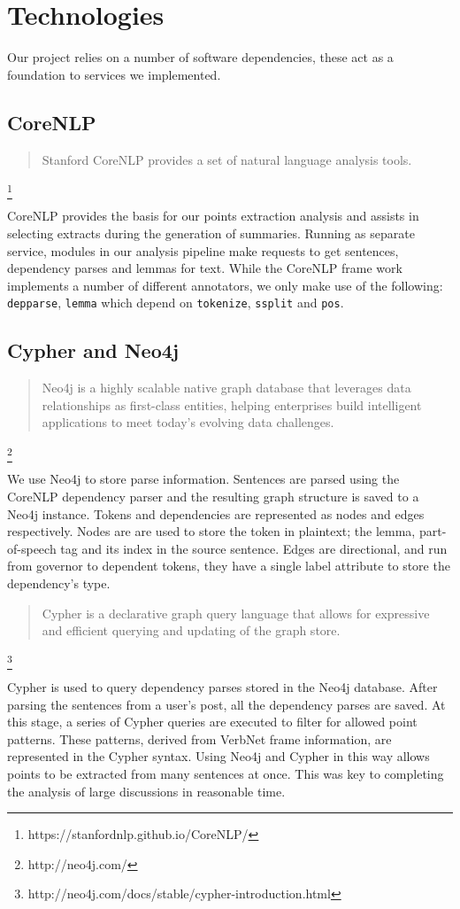 \chapter{Technologies\label{chap:technologies}}
  Our project relies on a number of software dependencies, these act as a foundation to services we implemented.

  \tocless\section{CoreNLP}
    \blockquote{Stanford CoreNLP provides a set of natural language analysis tools.}\footnote{https://stanfordnlp.github.io/CoreNLP/}

    CoreNLP provides the basis for our points extraction analysis and assists in selecting extracts during the generation of summaries. Running as separate service, modules in our analysis pipeline make requests to get sentences, dependency parses and lemmas for text. While the CoreNLP frame work implements a number of different annotators, we only make use of the following: \texttt{depparse}, \texttt{lemma} which depend on \texttt{tokenize}, \texttt{ssplit} and \texttt{pos}.

  \tocless\section{Cypher and Neo4j}
    \blockquote{Neo4j is a highly scalable native graph database that leverages data relationships as first-class entities, helping enterprises build intelligent applications to meet today's evolving data challenges.}\footnote{http://neo4j.com/}

    We use Neo4j to store parse information. Sentences are parsed using the CoreNLP dependency parser and the resulting graph structure is saved to a Neo4j instance. Tokens and dependencies are represented as nodes and edges respectively. Nodes are are used to store the token in plaintext; the lemma, part-of-speech tag and its index in the source sentence. Edges are directional, and run from governor to dependent tokens, they have a single label attribute to store the dependency's type.

    \blockquote{Cypher is a declarative graph query language that allows for expressive and efficient querying and updating of the graph store.}\footnote{http://neo4j.com/docs/stable/cypher-introduction.html}

    Cypher is used to query dependency parses stored in the Neo4j database. After parsing the sentences from a user's post, all the dependency parses are saved. At this stage, a series of Cypher queries are executed to filter for allowed point patterns. These patterns, derived from VerbNet frame information, are represented in the Cypher syntax. Using Neo4j and Cypher in this way allows points to be extracted from many sentences at once. This was key to completing the analysis of large discussions in reasonable time.

